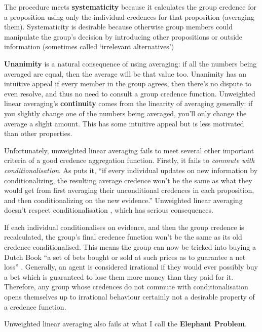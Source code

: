 \documentclass{article}
\begin{document}
The procedure meets \textbf{systematicity} because it calculates the group credence for a proposition using only the individual credences for that proposition (averaging them). Systematicity is desirable because otherwise group members could manipulate the group's decision by introducing other propositions or outside information (sometimes called `irrelevant alternatives')

\textbf{Unanimity} is a natural consequence of using averaging: if all the numbers being averaged are equal, then the average will be that value too. Unanimity has an intuitive appeal \textemdash{} if every member in the group agrees, then there's no dispute to even resolve, and thus no need to consult a group credence function. Unweighted linear averaging's \textbf{continuity} comes from the linearity of averaging generally: if you slightly change one of the numbers being averaged, you'll only change the average a slight amount. This has some intuitive appeal but is less motivated than other properties.

Unfortunately, unweighted linear averaging fails to meet several other important criteria of a good credence aggregation function. Firstly, it fails to \textit{commute with conditionalisation}. As \citet[pg. 1290]{russell2015groupthink} puts it, ``if every individual updates on new information by conditionalizing, the resulting average credence won’t be the same as what they would get from first averaging their unconditional credences in each proposition, and then conditionalizing on the new evidence.'' Unweighted linear averaging doesn't respect conditionalisation \citep[pg. 87]{loewer1985destroying}, which has serious consequences.

If each individual conditionalises on evidence, and then the group credence is recalculated, the group's final credence function won't be the same as its old credence conditionalised. This means the group can now be tricked into buying a Dutch Book \textemdash{} ``a set of bets bought or sold at such prices as to guarantee a net loss'' \citep{hajek2008dutch}. Generally, an agent is considered irrational if they would ever possibly buy a bet which is guaranteed to lose them more money than they paid for it. Therefore, any group whose credences do not commute with conditionalisation opens themselves up to irrational behaviour \textemdash{} certainly not a desirable property of a credence function.

Unweighted linear averaging also fails at what I call the \textbf{Elephant Problem}. 






\end{document}
